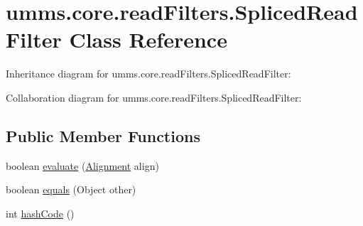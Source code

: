\hypertarget{classumms_1_1core_1_1read_filters_1_1_spliced_read_filter}{\section{umms.\+core.\+read\+Filters.\+Spliced\+Read\+Filter Class Reference}
\label{classumms_1_1core_1_1read_filters_1_1_spliced_read_filter}
}


Inheritance diagram for umms.\+core.\+read\+Filters.\+Spliced\+Read\+Filter\+:


Collaboration diagram for umms.\+core.\+read\+Filters.\+Spliced\+Read\+Filter\+:
\subsection*{Public Member Functions}
\begin{DoxyCompactItemize}
\item 
boolean \hyperlink{classumms_1_1core_1_1read_filters_1_1_spliced_read_filter_abb702029fcc23b0408e1b022bc0b01d1}{evaluate} (\hyperlink{interfaceumms_1_1core_1_1alignment_1_1_alignment}{Alignment} align)
\item 
boolean \hyperlink{classumms_1_1core_1_1read_filters_1_1_spliced_read_filter_a7b149e0e2389851908b48d4d9a6e7726}{equals} (Object other)
\item 
int \hyperlink{classumms_1_1core_1_1read_filters_1_1_spliced_read_filter_a8a5009c562a12151f52a876cc622c961}{hash\+Code} ()
\end{DoxyCompactItemize}


